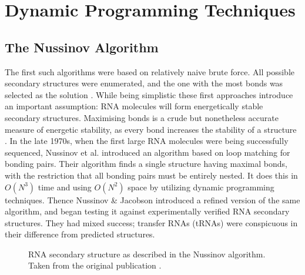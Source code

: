 \documentclass{cshonours}
\begin{document}
\section{Dynamic Programming Techniques}
\subsection{The Nussinov Algorithm}
The first such algorithms were based on relatively naive brute force. All possible secondary structures were enumerated, and the one with
the most bonds was selected as the solution \cite{nussinov1978algorithms}. While being simplistic
these first approaches introduce an important assumption: RNA molecules will
form energetically stable secondary structures. Maximising bonds is a crude but
nonetheless accurate measure of energetic stability, as every bond increases the
stability of a structure \cite{nussinov1978algorithms}. In the late 1970s, when the first large RNA molecules
were being successfully sequenced, Nussinov et al. \cite{nussinov1978algorithms} introduced an algorithm
based on loop matching for bonding pairs. Their algorithm finds a
single structure having maximal bonds, with the restriction that all bonding pairs must be entirely nested. It does this in $O(N^3)$ time and using $O(N^2)$ space by utilizing dynamic programming techniques. Thence Nussinov \& Jacobson \cite{nussinov1980fast} introduced
a refined version of the same algorithm, and began testing it against experimentally verified RNA secondary structures. They had mixed success; transfer RNAs
(tRNAs) were conspicuous in their difference from predicted structures.

\begin{figure}
\begin{center}
\end{center}
\caption{RNA secondary structure as described in the Nussinov algorithm.
Taken from the original publication \cite{nussinov1980fast}.}
\label{nuss_rna}
\end{figure}
\end{document}
